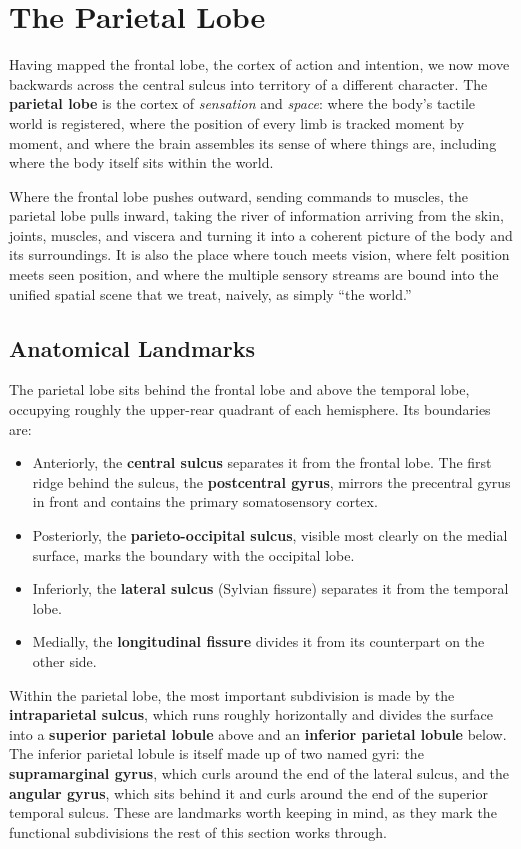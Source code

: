 \documentclass[11pt]{article}
\begin{document}
\section{The Parietal Lobe}

Having mapped the frontal lobe, the cortex of action and intention, we now move backwards across the central sulcus into territory of a different character. The \textbf{parietal lobe} is the cortex of \textit{sensation} and \textit{space}: where the body's tactile world is registered, where the position of every limb is tracked moment by moment, and where the brain assembles its sense of where things are, including where the body itself sits within the world.

Where the frontal lobe pushes outward, sending commands to muscles, the parietal lobe pulls inward, taking the river of information arriving from the skin, joints, muscles, and viscera and turning it into a coherent picture of the body and its surroundings. It is also the place where touch meets vision, where felt position meets seen position, and where the multiple sensory streams are bound into the unified spatial scene that we treat, naively, as simply ``the world.''

\subsection{Anatomical Landmarks}

The parietal lobe sits behind the frontal lobe and above the temporal lobe, occupying roughly the upper-rear quadrant of each hemisphere. Its boundaries are:

\begin{itemize}
    \item Anteriorly, the \textbf{central sulcus} separates it from the frontal lobe. The first ridge behind the sulcus, the \textbf{postcentral gyrus}, mirrors the precentral gyrus in front and contains the primary somatosensory cortex.
    \item Posteriorly, the \textbf{parieto-occipital sulcus}, visible most clearly on the medial surface, marks the boundary with the occipital lobe.
    \item Inferiorly, the \textbf{lateral sulcus} (Sylvian fissure) separates it from the temporal lobe.
    \item Medially, the \textbf{longitudinal fissure} divides it from its counterpart on the other side.
\end{itemize}

Within the parietal lobe, the most important subdivision is made by the \textbf{intraparietal sulcus}, which runs roughly horizontally and divides the surface into a \textbf{superior parietal lobule} above and an \textbf{inferior parietal lobule} below. The inferior parietal lobule is itself made up of two named gyri: the \textbf{supramarginal gyrus}, which curls around the end of the lateral sulcus, and the \textbf{angular gyrus}, which sits behind it and curls around the end of the superior temporal sulcus. These are landmarks worth keeping in mind, as they mark the functional subdivisions the rest of this section works through.
\end{document}
